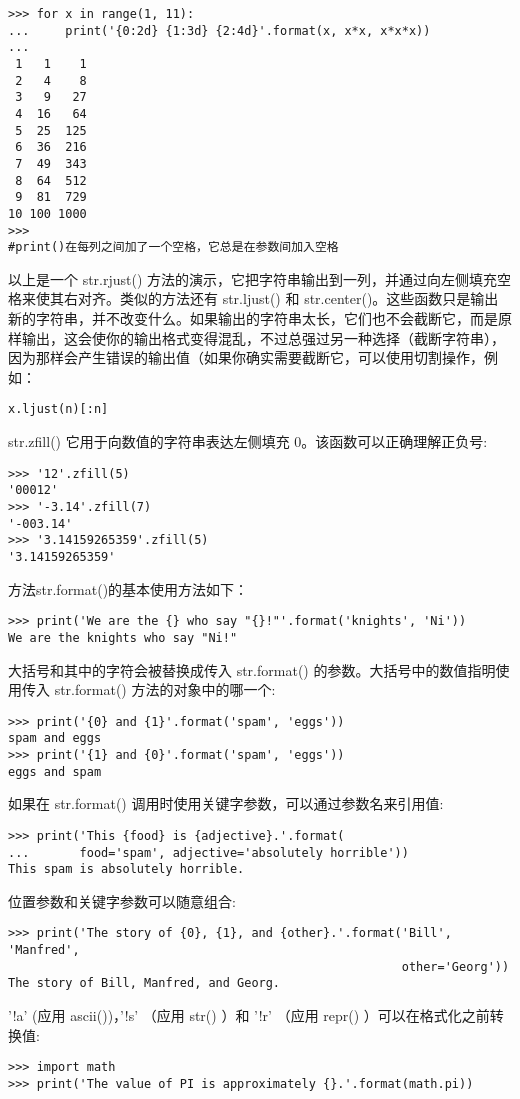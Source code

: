 \documentclass{article}
\begin{document}
\begin{CJK}{UTF8}{gbsn}
\begin{verbatim}
>>> for x in range(1, 11):
...     print('{0:2d} {1:3d} {2:4d}'.format(x, x*x, x*x*x))
...
 1   1    1
 2   4    8
 3   9   27
 4  16   64
 5  25  125
 6  36  216
 7  49  343
 8  64  512
 9  81  729
10 100 1000
>>>
#print()在每列之间加了一个空格，它总是在参数间加入空格
\end{verbatim}
以上是一个 str.rjust() 方法的演示，它把字符串输出到一列，并通过向左侧填充空格来使其右对齐。类似的方法还有 str.ljust() 和 str.center()。这些函数只是输出新的字符串，并不改变什么。如果输出的字符串太长，它们也不会截断它，而是原样输出，这会使你的输出格式变得混乱，不过总强过另一种选择（截断字符串），因为那样会产生错误的输出值（如果你确实需要截断它，可以使用切割操作，例如：
\begin{verbatim}
x.ljust(n)[:n] 
\end{verbatim}
str.zfill() 它用于向数值的字符串表达左侧填充 0。该函数可以正确理解正负号:
\begin{verbatim}
>>> '12'.zfill(5)
'00012'
>>> '-3.14'.zfill(7)
'-003.14'
>>> '3.14159265359'.zfill(5)
'3.14159265359'
\end{verbatim}
方法str.format()的基本使用方法如下：
\begin{verbatim}
>>> print('We are the {} who say "{}!"'.format('knights', 'Ni'))
We are the knights who say "Ni!"
\end{verbatim}
大括号和其中的字符会被替换成传入 str.format() 的参数。大括号中的数值指明使用传入 str.format() 方法的对象中的哪一个:
\begin{verbatim}
>>> print('{0} and {1}'.format('spam', 'eggs'))
spam and eggs
>>> print('{1} and {0}'.format('spam', 'eggs'))
eggs and spam
\end{verbatim}
如果在 str.format() 调用时使用关键字参数，可以通过参数名来引用值:
\begin{verbatim}
>>> print('This {food} is {adjective}.'.format(
...       food='spam', adjective='absolutely horrible'))
This spam is absolutely horrible.
\end{verbatim}
位置参数和关键字参数可以随意组合:
\begin{verbatim}
>>> print('The story of {0}, {1}, and {other}.'.format('Bill', 'Manfred',
                                                       other='Georg'))
The story of Bill, Manfred, and Georg.
\end{verbatim}
'!a' (应用 ascii())，'!s' （应用 str() ）和 '!r' （应用 repr() ）可以在格式化之前转换值:
\begin{verbatim}
>>> import math
>>> print('The value of PI is approximately {}.'.format(math.pi))

\end{verbatim}
\end{CJK}
\end{document}
